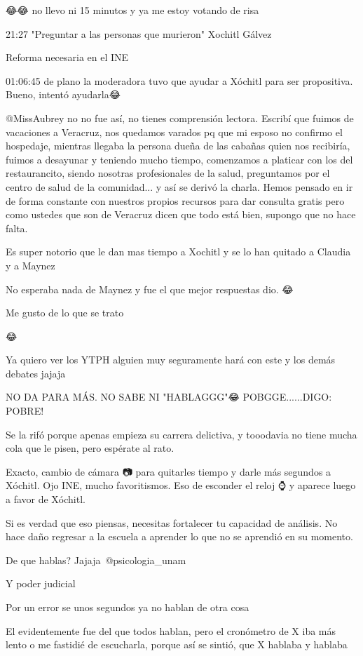 😂😂 no llevo ni 15 minutos y ya me estoy votando de risa

21:27 "Preguntar a las personas que murieron" Xochitl Gálvez

Reforma necesaria en el INE

01:06:45 de plano la moderadora tuvo que ayudar a Xóchitl para ser propositiva. Bueno, intentó ayudarla😂

@MissAubrey no no fue así, no tienes comprensión lectora. Escribí que fuimos de vacaciones a Veracruz, nos quedamos varados pq que mi esposo no confirmo el hospedaje, mientras llegaba la persona dueña de las cabañas quien nos recibiría, fuimos a desayunar y teniendo mucho tiempo, comenzamos a platicar con los del restaurancito, siendo nosotras profesionales de la salud, preguntamos por el centro de salud de la comunidad... y así se derivó la charla. 
Hemos pensado en ir de forma constante con nuestros propios recursos para dar consulta gratis pero como ustedes que son de Veracruz dicen que todo está bien, supongo que no hace falta.

Es super notorio que le dan mas tiempo a Xochitl y se lo han quitado a Claudia y a Maynez

No esperaba nada de Maynez y fue el que mejor respuestas dio. 😂

Me gusto de lo que se trato

😂

Ya quiero ver los YTPH alguien muy seguramente hará con este y los demás debates jajaja

NO DA PARA MÁS.
NO SABE NI "HABLAGGG"😂
POBGGE......DIGO: POBRE!

Se la rifó porque apenas empieza su carrera delictiva, y tooodavia no tiene mucha cola que le pisen, pero espérate al rato.

Exacto, cambio de cámara 📷 para quitarles tiempo y darle más segundos a Xóchitl. Ojo INE, mucho favoritismos. Eso de esconder el reloj ⌚ y aparece luego a favor de Xóchitl.

Si es verdad que eso piensas, necesitas fortalecer tu capacidad de análisis. No hace daño regresar a la escuela a aprender lo que no se aprendió en su momento.

De que hablas? Jajaja​ @psicologia_unam 

Y poder judicial

Por un error se unos segundos ya no hablan de otra cosa

El evidentemente fue del que todos hablan, pero el cronómetro de X iba más lento o me fastidié de escucharla, porque así se sintió, que X hablaba y hablaba

